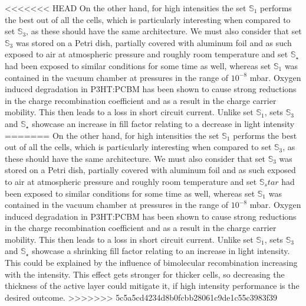 \documentclass[a4paper,10pt,twocolumn]{article}
\begin{document}
\begin{extract*}
<<<<<<< HEAD
On the other hand, for high intensities the set $\mathbb{S}_1$ performs the best out of all the cells, which is particularly interesting when compared to set $\mathbb{S}_3$, as these should have the same architecture. We must also consider that set $\mathbb{S}_3$ was stored on a Petri dish, partially covered with aluminum foil and as such exposed to air at atmospheric pressure and roughly room temperature and set $\mathbb{S}_\star$ had been exposed to similar conditions for some time as well, whereas set $\mathbb{S}_1$ was contained in the vacuum chamber at pressures in the range of $10^{-8}$ mbar. Oxygen induced degradation in P3HT:PCBM has been shown \cite{source14} to cause strong reductions in the charge recombination coefficient and as a result in the charge carrier mobility. This then leads to a loss in short circuit current.\mypar
Unlike set $\mathbb{S}_1$, sets $\mathbb{S}_3$ and $\mathbb{S}_\star$ showcase an increase in fill factor relating to a decrease in light intensity
=======
On the other hand, for high intensities the set $\mathbb{S}_1$ performs the best out of all the cells, which is particularly interesting when compared to set $\mathbb{S}_3$, as these should have the same architecture. We must also consider that set $\mathbb{S}_3$ was stored on a Petri dish, partially covered with aluminum foil and as such exposed to air at atmospheric pressure and roughly room temperature and set $\mathbb{S}_star$ had been exposed to similar conditions for some time as well, whereas set $\mathbb{S}_1$ was contained in the vacuum chamber at pressures in the range of $10^{-8}$ mbar. Oxygen induced degradation in P3HT:PCBM has been shown\cite{source14} to cause strong reductions in the charge recombination coefficient and as a result in the charge carrier mobility. This then leads to a loss in short circuit current.\mypar
Unlike set $\mathbb{S}_1$, sets $\mathbb{S}_3$ and $\mathbb{S}_\star$ showcase a shrinking fill factor relating to an increase in light intensity. This could be explained by the influence of bimolecular recombination increasing with the intensity\cite{source15}. This effect gets stronger for thicker cells, so decreasing the thickness of the active layer could mitigate it, if high intensity performance is the desired outcome.
>>>>>>> 5c5a5cd4234d8b0fcbb28061c9de1c55c3983f39


\end{extract*}
\end{document}
